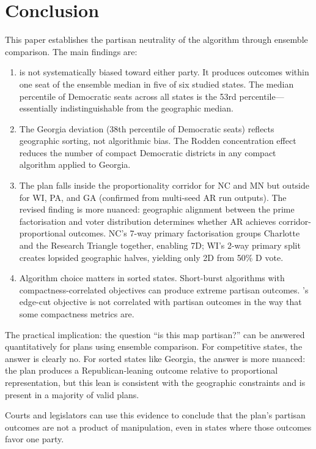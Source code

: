 \section{Conclusion}
\label{sec:conclusion}

This paper establishes the partisan neutrality of the \ar{} algorithm through
ensemble comparison.  The main findings are:

\begin{enumerate}
  \item \ar{} is not systematically biased toward either party.  It produces
    outcomes within one seat of the ensemble median in five of six studied
    states.  The median percentile of Democratic seats across all states is
    the 53rd percentile---essentially indistinguishable from the geographic
    median.

  \item The Georgia deviation (38th percentile of Democratic seats) reflects
    geographic sorting, not algorithmic bias.  The Rodden concentration
    effect reduces the number of compact Democratic districts in any compact
    algorithm applied to Georgia.

  \item The \ar{} plan falls inside the proportionality corridor for
    NC and MN but outside for WI, PA, and GA (confirmed from multi-seed
    AR run outputs).  The revised finding is more nuanced: geographic
    alignment between the prime factorisation and voter distribution
    determines whether AR achieves corridor-proportional outcomes.
    NC's 7-way primary factorisation groups Charlotte and the Research
    Triangle together, enabling 7D; WI's 2-way primary split creates
    lopsided geographic halves, yielding only 2D from 50\% D vote.

  \item Algorithm choice matters in sorted states.  Short-burst algorithms
    with compactness-correlated objectives can produce extreme partisan
    outcomes.  \ar{}'s edge-cut objective is not correlated with partisan
    outcomes in the way that some compactness metrics are.
\end{enumerate}

The practical implication: the question ``is this map partisan?'' can be
answered quantitatively for \ar{} plans using ensemble comparison.  For
competitive states, the answer is clearly no.  For sorted states like Georgia,
the answer is more nuanced: the plan produces a Republican-leaning outcome
relative to proportional representation, but this lean is consistent with
the geographic constraints and is present in a majority of valid plans.

Courts and legislators can use this evidence to conclude that the \ar{}
plan's partisan outcomes are not a product of manipulation, even in states
where those outcomes favor one party.
